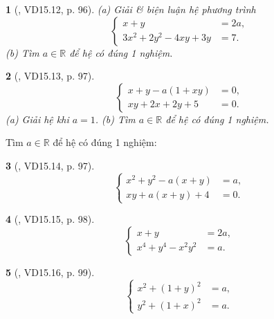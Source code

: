 \documentclass{article}
\newtheorem{baitoan}{}
\begin{document}
\begin{baitoan}[\cite{TLCT_THCS_Toan_9_dai_so}, VD15.12, p. 96]
	(a) Giải \& biện luận hệ phương trình
	\begin{equation*}
		\left\{\begin{split}
			x + y &= 2a,\\
			3x^2 + 2y^2 - 4xy + 3y &= 7.
		\end{split}\right.
	\end{equation*}
	(b) Tìm $a\in\mathbb{R}$ để hệ có đúng 1 nghiệm.
\end{baitoan}

\begin{baitoan}[\cite{TLCT_THCS_Toan_9_dai_so}, VD15.13, p. 97]
	\begin{equation*}
		\left\{\begin{split}
			x + y - a(1 + xy) &= 0,\\
			xy + 2x + 2y + 5 &= 0.
		\end{split}\right.
	\end{equation*}
	(a) Giải hệ khi $a = 1$. (b) Tìm $a\in\mathbb{R}$ để hệ có đúng 1 nghiệm.
\end{baitoan}
Tìm $a\in\mathbb{R}$ để hệ có đúng 1 nghiệm:

\begin{baitoan}[\cite{TLCT_THCS_Toan_9_dai_so}, VD15.14, p. 97]
	\begin{equation*}
		\left\{\begin{split}
			x^2 + y^2 - a(x + y) &= a,\\
			xy + a(x + y) + 4 &= 0.
		\end{split}\right.
	\end{equation*}
\end{baitoan}

\begin{baitoan}[\cite{TLCT_THCS_Toan_9_dai_so}, VD15.15, p. 98]
	\begin{equation*}
		\left\{\begin{split}
			x + y &= 2a,\\
			x^4 + y^4 - x^2y^2 &= a.
		\end{split}\right.
	\end{equation*}
\end{baitoan}

\begin{baitoan}[\cite{TLCT_THCS_Toan_9_dai_so}, VD15.16, p. 99]
	\begin{equation*}
		\left\{\begin{split}
			x^2 + (1 + y)^2 &= a,\\
			y^2 + (1 + x)^2 &= a.
		\end{split}\right.
	\end{equation*}
\end{baitoan}
\end{document}
